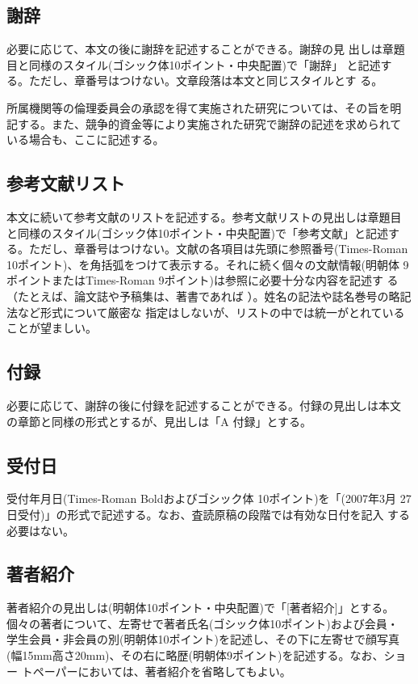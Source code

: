 \documentclass[a4paper,twoside]{jarticle}
\begin{document}
\subsection{謝辞}
必要に応じて、本文の後に謝辞を記述することができる。謝辞の見
出しは章題目と同様のスタイル(ゴシック体10ポイント・中央配置)で「謝辞」
と記述する。ただし、章番号はつけない。文章段落は本文と同じスタイルとす
る。

所属機関等の倫理委員会の承認を得て実施された研究については、その旨を明
記する。また、競争的資金等により実施された研究で謝辞の記述を求められて
いる場合も、ここに記述する。

\subsection{参考文献リスト}
本文に続いて参考文献のリストを記述する。参考文献リストの見出しは章題目
と同様のスタイル(ゴシック体10ポイント・中央配置)で「参考文献」と記述す
る。ただし、章番号はつけない。文献の各項目は先頭に参照番号(Times-Roman
10ポイント)、を角括弧をつけて表示する。それに続く個々の文献情報(明朝体
9ポイントまたはTimes-Roman 9ポイント)は参照に必要十分な内容を記述す
る（たとえば、論文誌や予稿集は\cite{bib1,bib2,bib3,bib4}、著書であれば
\cite{bib5,bib6}）。姓名の記法や誌名巻号の略記法など形式について厳密な
指定はしないが、リストの中では統一がとれていることが望ましい。

\subsection{付録}
必要に応じて、謝辞の後に付録を記述することができる。付録の見出しは本文
の章節と同様の形式とするが、見出しは「A 付録」とする。

\subsection{受付日}
受付年月日(Times-Roman Boldおよびゴシック体 10ポイント)を「(2007年3月
27日受付)」の形式で記述する。なお、査読原稿の段階では有効な日付を記入
する必要はない。

\subsection{著者紹介}
著者紹介の見出しは(明朝体10ポイント・中央配置)で「[著者紹介]」とする。
個々の著者について、左寄せで著者氏名(ゴシック体10ポイント)および会員・
学生会員・非会員の別(明朝体10ポイント)を記述し、その下に左寄せで顔写真
(幅15mm高さ20mm)、その右に略歴(明朝体9ポイント)を記述する。なお、ショー
トペーパーにおいては、著者紹介を省略してもよい。
\end{document}
